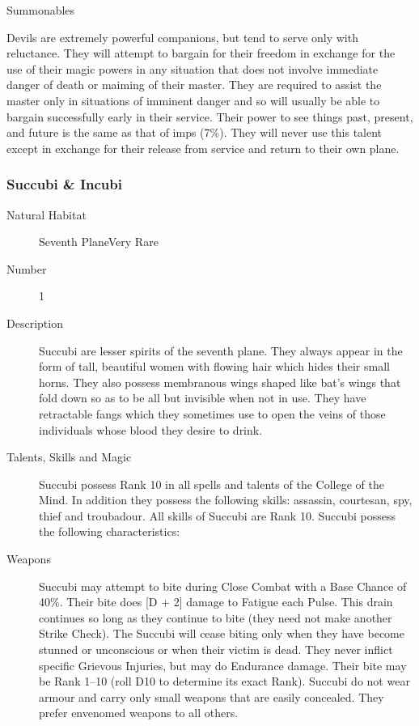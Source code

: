 \begin{mmgroup}{Summonables}
\begin{mmcomment}
Devils are extremely powerful companions, but tend to serve
only with reluctance.  They will attempt to bargain for their freedom
in exchange for the use of their magic powers in any situation that
does not involve immediate danger of death or maiming of their master.
They are required to assist the master only in situations of imminent
danger and so will usually be able to bargain successfully early in
their service.  Their power to see things past, present, and future is
the same as that of imps (7\%).  They will never use this talent
except in exchange for their release from service and return to their
own plane.

\end{mmcomment}

\subsubsection{Succubi \& Incubi}

\begin{description}
\item[Natural Habitat]Seventh PlaneVery Rare

\item[Number] 1

\item[Description]Succubi are lesser spirits of the seventh plane.  They always appear
in the form of tall, beautiful women with flowing hair which hides
their small horns.  They also possess membranous wings shaped like
bat's wings that fold down so as to be all but invisible when not in
use.  They have retractable fangs which they sometimes use to open the
veins of those individuals whose blood they desire to drink.

\item[Talents, Skills and Magic]Succubi possess Rank 10 in all spells and talents of the College of
the Mind.  In addition they possess the following skills: assassin,
courtesan, spy, thief and troubadour. All skills of Succubi are Rank
10.  Succubi possess the following characteristics:

\item[Weapons]Succubi may attempt to bite during Close Combat with a Base Chance of
40\%.  Their bite does [D + 2] damage to Fatigue each Pulse.
This drain continues so long as they continue to bite (they need not
make another Strike Check).  The Succubi will cease biting only when
they have become stunned or unconscious or when their victim is dead.
They never inflict specific Grievous Injuries, but may do Endurance
damage.  Their bite may be Rank 1--10 (roll D10 to determine its exact
Rank).  Succubi do not wear armour and carry only small weapons that
are easily concealed.  They prefer envenomed weapons to all others.


\end{description}
\end{mmgroup}
